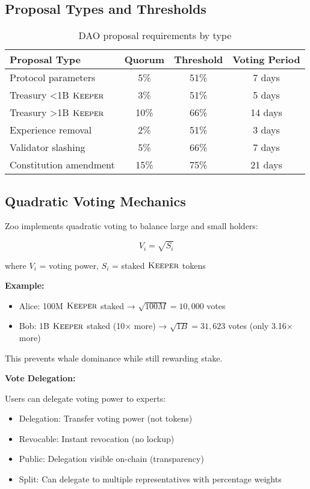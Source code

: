 \documentclass[11pt,letterpaper]{article}
\theoremstyle{definition}
\theoremstyle{remark}
\newcommand{\KEEPER}{\textsc{Keeper}}
\begin{document}
\subsection{Proposal Types and Thresholds}

\begin{table}[h]
\centering
\begin{tabular}{lccc}
\toprule
\textbf{Proposal Type} & \textbf{Quorum} & \textbf{Threshold} & \textbf{Voting Period} \\
\midrule
Protocol parameters & 5\% & 51\% & 7 days \\
Treasury <1B $\KEEPER$ & 3\% & 51\% & 5 days \\
Treasury >1B $\KEEPER$ & 10\% & 66\% & 14 days \\
Experience removal & 2\% & 51\% & 3 days \\
Validator slashing & 5\% & 66\% & 7 days \\
Constitution amendment & 15\% & 75\% & 21 days \\
\bottomrule
\end{tabular}
\caption{DAO proposal requirements by type}
\label{tab:dao_proposals}
\end{table}

\subsection{Quadratic Voting Mechanics}

Zoo implements quadratic voting to balance large and small holders:

\begin{equation}
V_i = \sqrt{S_i}
\end{equation}

where $V_i$ = voting power, $S_i$ = staked $\KEEPER$ tokens

\textbf{Example:}
\begin{itemize}
\item Alice: 100M $\KEEPER$ staked → $\sqrt{100M} = 10,000$ votes
\item Bob: 1B $\KEEPER$ staked (10× more) → $\sqrt{1B} = 31,623$ votes (only 3.16× more)
\end{itemize}

This prevents whale dominance while still rewarding stake.

\textbf{Vote Delegation:}

Users can delegate voting power to experts:
\begin{itemize}
\item Delegation: Transfer voting power (not tokens)
\item Revocable: Instant revocation (no lockup)
\item Public: Delegation visible on-chain (transparency)
\item Split: Can delegate to multiple representatives with percentage weights
\end{itemize}
\end{document}
